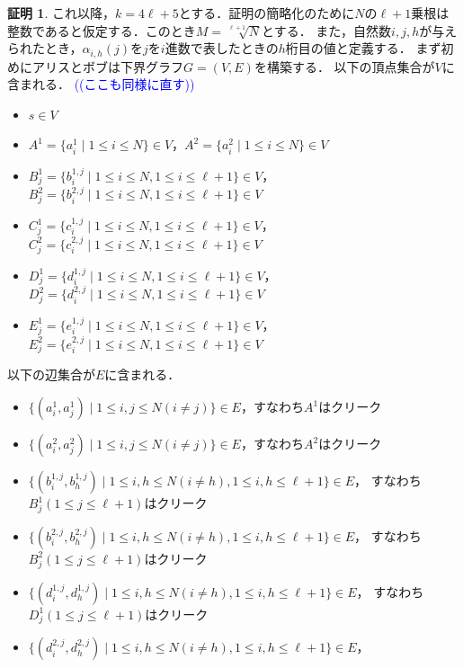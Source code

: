 \documentclass[12pt]{thesis}
\newcommand{\Izumi}[1]{\textcolor{blue}{(#1)}}
\theoremstyle{definition}
\newtheorem*{prf*}{証明}
\begin{document}
\begin{prf*}
これ以降，$k = 4\ell +5$とする．証明の簡略化のために$N$の$\ell + 1$乗根は整数であると仮定する．このとき$M = \sqrt[\ell + 1]{N}$とする．
また，自然数$i, j, h$が与えられたとき，$\alpha_{i, h}(j)$を$j$を$i$進数で表したときの$h$桁目の値と定義する．
まず初めにアリスとボブは下界グラフ$G = (V, E)$を構築する．
以下の頂点集合が$V$に含まれる．
\Izumi{(ここも同様に直す)}
\begin{itemize}
\item $s \in V$
\item $A^{1} = \{a^{1}_{i} \mid 1\leq i \leq N\}  \in V$，$A^{2} = \{a^{2}_{i} \mid 1\leq i \leq N\} \in V$
\item $B^{1}_{j} = \{b^{1,j}_{i} \mid 1\leq i \leq N,1\leq i \leq \ell+1\} \in V$，
$B^{2}_{j} = \{b^{2,j}_{i} \mid 1\leq i \leq N,1\leq i \leq \ell+1\} \in V$
\item $C^{1}_{j} = \{c^{1,j}_{i} \mid 1\leq i \leq N,1\leq i \leq \ell+1\} \in V$，
$C^{2}_{j} = \{c^{2,j}_{i} \mid 1\leq i \leq N,1\leq i \leq \ell+1\} \in V$
\item $D^{1}_{j} = \{d^{1,j}_{i} \mid 1\leq i \leq N,1\leq i \leq \ell+1\} \in V$，
$D^{2}_{j} = \{d^{2,j}_{i} \mid 1\leq i \leq N,1\leq i \leq \ell+1\} \in V$
\item $E^{1}_{j} = \{e^{1,j}_{i} \mid 1\leq i \leq N,1\leq i \leq \ell+1\} \in V$，
$E^{2}_{j} = \{e^{2,j}_{i} \mid 1\leq i \leq N,1\leq i \leq \ell+1\} \in V$
\end{itemize}
以下の辺集合が$E$に含まれる．
\begin{itemize}
\item $\{(a^{1}_{i}, a^{1}_{j}) \mid 1\leq i,j \leq N(i \neq j)\} \in E$，すなわち$A^{1}$はクリーク
\item $\{(a^{2}_{i}, a^{2}_{j}) \mid 1\leq i,j \leq N(i \neq j)\} \in E$，すなわち$A^{2}$はクリーク
\item $\{(b^{1,j}_{i}, b^{1,j}_{h}) \mid 1\leq i,h \leq N(i \neq h),1\leq i,h \leq \ell+1\} \in E$，
すなわち$B^{1}_{j}(1\leq j \leq \ell+1)$はクリーク
\item $\{(b^{2,j}_{i}, b^{2,j}_{h}) \mid 1\leq i,h \leq N(i \neq h),1\leq i,h \leq \ell+1\} \in E$，
すなわち$B^{2}_{j}(1\leq j \leq \ell+1)$はクリーク
\item $\{(d^{1,j}_{i}, d^{1,j}_{h}) \mid 1\leq i,h \leq N(i \neq h),1\leq i,h \leq \ell+1\} \in E$，
すなわち$D^{1}_{j}(1\leq j \leq \ell+1)$はクリーク
\item $\{(d^{2,j}_{i}, d^{2,j}_{h}) \mid 1\leq i,h \leq N(i \neq h),1\leq i,h \leq \ell+1\} \in E$，

\end{itemize}
\end{prf*}
\end{document}
